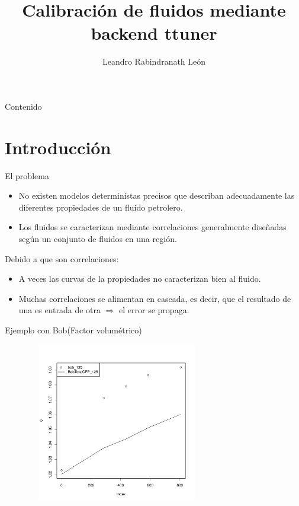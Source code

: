 \documentclass{beamer}
\institute[ULA]{Universidad de Los Andes}
\author{Leandro Rabindranath León}
\title{Calibración de fluidos mediante backend ttuner}
\begin{document}
 \begin{frame}
  \maketitle 
 \end{frame}

 \begin{frame}{Contenido}
  \tableofcontents
 \end{frame}

\section{Introducción}

 \begin{frame}{El problema}
  
  \begin{block}{}
   \begin{itemize}
    \item No existen modelos deterministas precisos que describan adecuadamente
	  las diferentes propiedades de un fluido petrolero.

    \item Los fluidos se caracterizan mediante correlaciones generalmente
	  diseñadas según un conjunto de fluidos en una región.

   \end{itemize}
   
   Debido a que son correlaciones:

   \begin{itemize}
    \item A veces las curvas de la propiedades no caracterizan bien al
	  fluido.

    \item Muchas correlaciones se alimentan en cascada, es decir, que el
	  resultado de una es entrada de otra $\Rightarrow$ el error se
	  propaga.
   \end{itemize}

  \end{block}
 \end{frame}

 \begin{frame}{Ejemplo con Bob}{(Factor volumétrico)}
  \begin{center}
    \includegraphics[width=10cm, height=7cm]{bob.pdf}
  \end{center}
 \end{frame}
\end{document}
